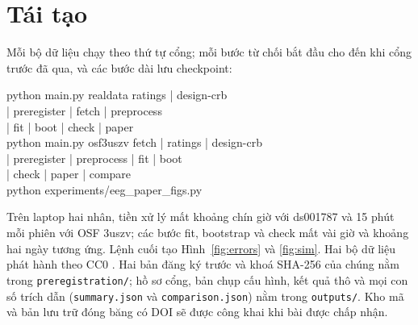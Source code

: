 \section{Tái tạo}
\label{app:repro}
Mỗi bộ dữ liệu chạy theo thứ tự cổng; mỗi bước từ chối bắt đầu cho đến khi cổng trước đã qua, và các bước dài lưu checkpoint:
\begin{flushleft}\footnotesize\ttfamily
python main.py realdata ratings | design-crb\\
\hspace*{1.5em}| preregister | fetch | preprocess\\
\hspace*{1.5em}| fit | boot | check | paper\\
python main.py osf3uszv fetch | ratings | design-crb\\
\hspace*{1.5em}| preregister | preprocess | fit | boot\\
\hspace*{1.5em}| check | paper | compare\\
python experiments/eeg\_paper\_figs.py
\end{flushleft}
Trên laptop hai nhân, tiền xử lý mất khoảng chín giờ với ds001787 và 15 phút mỗi phiên với OSF 3uszv; các bước fit, bootstrap và check mất vài giờ và khoảng hai ngày tương ứng. Lệnh cuối tạo Hình~\ref{fig:errors} và \ref{fig:sim}. Hai bộ dữ liệu phát hành theo CC0 \cite{Delorme2024ds,RodriguezLarios2021}. Hai bản đăng ký trước và khoá SHA-256 của chúng nằm trong \texttt{preregistration/}; hồ sơ cổng, bản chụp cấu hình, kết quả thô và mọi con số trích dẫn (\texttt{summary.json} và \texttt{comparison.json}) nằm trong \texttt{outputs/}. Kho mã và bản lưu trữ đóng băng có DOI sẽ được công khai khi bài được chấp nhận.
